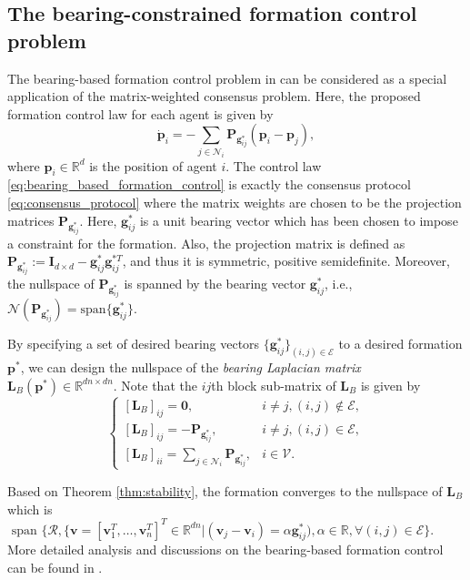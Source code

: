 \documentclass[draftclsnofoot,11pt,onecolumn]{IEEEtran}
\newcommand{\m}[1]{\mathbf{#1}}
\newcommand{\mc}[1]{\mathcal{#1}}
\newcommand{\mb}[1]{\mathbb{#1}}
\begin{document}
\subsection{The bearing-constrained formation control problem}
The bearing-based formation control problem in \cite{Zhao2015CDC} can be considered as a special application of the matrix-weighted consensus problem. Here, the proposed formation control law for each agent is given by
\begin{equation} \label{eq:bearing_based_formation_control}
\dot{\m{p}}_i = - \sum_{j \in \mc{N}_i} \m{P}_{\m{g}_{ij}^*}(\m{p}_i - \m{p}_{j}),
\end{equation}
where $\m{p}_i \in \mb{R}^d$ is the position of agent $i$. The control law \eqref{eq:bearing_based_formation_control} is exactly the consensus protocol \eqref{eq:consensus_protocol} where the matrix weights are chosen to be the projection matrices $\m{P}_{\m{g}_{ij}^*}$. Here, $\m{g}_{ij}^*$ is a unit bearing vector which has been chosen to impose a constraint for the formation. Also, the projection matrix is defined as  $\m{P}_{\m{g}_{ij}^*}:= \m{I}_{d \times d} - \m{g}_{ij}^* \m{g}_{ij}^{*T}$, and thus it is symmetric, positive semidefinite. Moreover, the nullspace of $\m{P}_{\m{g}_{ij}^*}$ is spanned by the bearing vector $\m{g}_{ij}^*$, i.e., $\mc{N}(\m{P}_{\m{g}_{ij}^*}) = \text{span}\{\m{g}_{ij}^*\}$.

By specifying a set of desired bearing vectors $\{\m{g}_{ij}^*\}_{(i,j) \in \mc{E}}$ to a desired formation $\m{p}^*$, we can design the nullspace of the \emph{bearing Laplacian matrix} $\m{L}_B(\m{p}^*) \in \mb{R}^{dn\times dn}$.
Note that the $ij$th block sub-matrix of $\m{L}_B$ is given by
\[\left\{ {\begin{array}{*{20}{l}}
  {{{\left[ {{\m{L}_B}} \right]}_{ij}} = \m{0},}&{i \ne j,\left( {i,j} \right) \notin \mc{E},} \\ 
  {{{\left[ {{\m{L}_B}} \right]}_{ij}}=  - {\m{P}_{\m{g}_{ij}^*}},}&{i \ne j,\left( {i,j} \right) \in \mc{E},} \\ 
  {\left[ {{\m{L}_B}} \right]_{ii} = \sum\nolimits_{j \in {\mc{N}_i}} {{\m{P}_{\m{g}_{ij}^*}},} }&{i \in \mc{V}.} 
\end{array}} \right.\]

Based on Theorem \ref{thm:stability}, the formation converges to the nullspace of $\m{L}_B$ which is $\text{ span }\{ \mc{R}, \{\m{v} = [\m{v}_1^T, \ldots, \m{v}_n^T]^T \in \mb{R}^{dn}| (\m{v}_j - \m{v}_i) = \alpha \m{g}_{ij}^*), \alpha \in \mb{R}, \forall (i,j) \in \mc{E} \}$.
More detailed analysis and discussions on the bearing-based formation control can be found in \cite{Zhao2015CDC,Zhao2015CNS,Zhao2016aut}.
\end{document}

